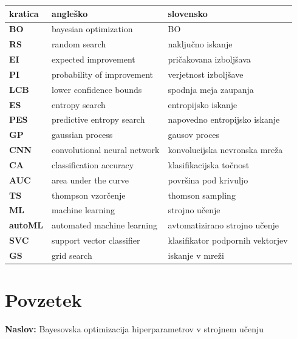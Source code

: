 \documentclass[a4paper, 12pt]{book}
\newcommand{\ttitle}{Bayesovska optimizacija hiperparametrov v strojnem učenju}
\newcommand{\clearemptydoublepage}{\newpage{\pagestyle{empty}\cleardoublepage}}
\begin{document}
\noindent\begin{tabular}{p{}|p{}|p{}}    %
  {\bf kratica} & {\bf angleško}                             & {\bf slovensko} \\ \hline
  {\bf BO} & bayesian optimization & BO \\
  {\bf RS} & random search & naključno iskanje \\
  {\bf EI} & expected improvement & pričakovana izboljšava \\
  {\bf PI} & probability of improvement & verjetnost izboljšave \\
  {\bf LCB} & lower confidence bounds & spodnja meja zaupanja \\
  {\bf ES} & entropy search & entropijsko iskanje \\
  {\bf PES} & predictive entropy search & napovedno entropijsko iskanje \\
  {\bf GP} & gaussian process & gausov proces \\
  {\bf CNN} & convolutional neural network & konvolucijska nevronska mreža \\
  {\bf CA} & classification accuracy & klasifikacijska točnost \\
  {\bf AUC} & area under the curve & površina pod krivuljo \\  
  {\bf TS} & thompson vzorčenje & thomson sampling \\
  {\bf ML} & machine learning  & strojno učenje \\
  {\bf autoML} & automated machine learning & avtomatizirano strojno učenje \\
  {\bf SVC} & support vector classifier & klasifikator podpornih vektorjev \\
  {\bf GS} & grid search & iskanje v mreži \\
\end{tabular}


\clearemptydoublepage

\chapter*{Povzetek}

\noindent\textbf{Naslov:} \ttitle
\bigskip
\end{document}
